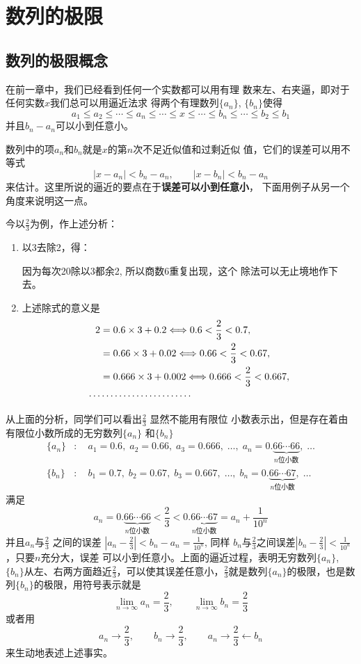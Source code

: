 \chapter{数列的极限}

\section{数列的极限概念}
在前一章中，我们已经看到任何一个实数都可以用有理
数来左、右夹逼，即对于任何实数$x$我们总可以用逼近法求
得两个有理数列$\{a_n\}$, $\{b_n\}$使得
\[a_1\le a_2\le \cdots \le a_n\le \cdots\le x\le \cdots\le b_n\le \cdots\le b_2\le b_1\]
并且$b_n-a_n$可以小到任意小。

数列中的项$a_n$和$b_n$就是$x$的第$n$次不足近似值和过剩近似
值，它们的误差可以用不等式
\[|x-a_n|<b_n-a_n,\qquad |x-b_n|<b_n-a_n\]
来估计。这里所说的逼近的要点在于\textbf{误差可以小到任意小}，
下面用例子从另一个角度来说明这一点。

今以$\frac{2}{3}$为例，作上述分析：
\begin{enumerate}
    \item 以3去除2，得：
    \begin{center}
    \end{center}
    因为每次20除以3都余2, 所以商数6重复出现，这个
    除法可以无止境地作下去。
    \item 上述除式的意义是
\[\begin{split}
    2&=0.6\times3+0.2\Longleftrightarrow 0.6<
\dfrac{2}{3}<0.7,\\
&=0.66\times3+0.02\Longleftrightarrow 0.66<
\dfrac{2}{3}<0.67,\\
&=0.666\times3+0.002\Longleftrightarrow 0.666<
\dfrac{2}{3}<0.667,\\
\cdots &\cdots\cdots\cdots\cdots\cdots\cdots\cdots
\end{split}\]
\end{enumerate}

从上面的分析，同学们可以看出$\frac{2}{3}$
显然不能用有限位
小数表示出，但是存在着由有限位小数所成的无穷数列$\{a_n\}$
和$\{b_n\}$
\[\begin{split}
    \{a_n\}&:\quad a_1=0.6,\; a_2=0.66,\; a_3=0.666,\; \ldots ,\; a_n=0.\underbrace{66\cdots66}_{\text{$n$位小数}},\; \ldots\\
    \{b_n\}&:\quad b_1=0.7,\; b_2=0.67,\; b_3=0.667,\; \ldots ,\; b_n=0.\underbrace{66\cdots67}_{\text{$n$位小数}},\; \ldots
\end{split}\]
满足 
\[a_n=0.\underbrace{66\cdots66}_{\text{$n$位小数}}<\frac{2}{3}<0.\underbrace{66\cdots67}_{\text{$n$位小数}}=a_n+\frac{1}{10^n}\]
并且$a_n$与$\frac{2}{3}$
之间的误差
$\left|a_n-\frac{2}{3}\right|<b_n-a_n=\frac{1}{10^n}$, 同样
$b_n$与$\frac{2}{3}$之间误差$\left|b_n-\frac{2}{3}\right|<\frac{1}{10^n}$，只要$n$充分大，误差
可以小到任意小。上面的逼近过程，表明无穷数列$\{a_n\}$, $\{b_n\}$从左、右两方面趋近$\frac{2}{3}$，可以使其误差任意小，$\frac{2}{3}$就是数列$\{a_n\}$的极限，也是数列$\{b_n\}$的极限，用符号表示就是
\[\lim_{n\to\infty}a_n=\frac{2}{3},\qquad \lim_{n\to\infty}b_n=\frac{2}{3}\]
或者用
\[a_n\to \frac{2}{3},\qquad b_n\to\frac{2}{3},\qquad a_n\to \frac{2}{3}\leftarrow b_n\]
来生动地表述上述事实。

